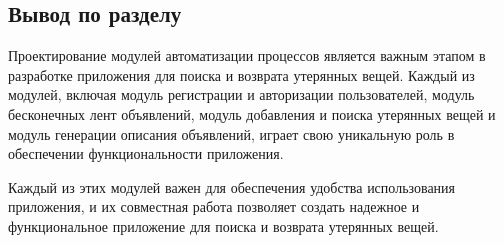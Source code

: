 \subsection*{Вывод по разделу}

Проектирование модулей автоматизации процессов является важным этапом в разработке приложения для поиска и возврата утерянных вещей. Каждый из модулей, включая модуль регистрации и авторизации пользователей, модуль бесконечных лент объявлений, модуль добавления и поиска утерянных вещей и модуль генерации описания объявлений, играет свою уникальную роль в обеспечении функциональности приложения.

Каждый из этих модулей важен для обеспечения удобства использования приложения, и их совместная работа позволяет создать надежное и функциональное приложение для поиска и возврата утерянных вещей.